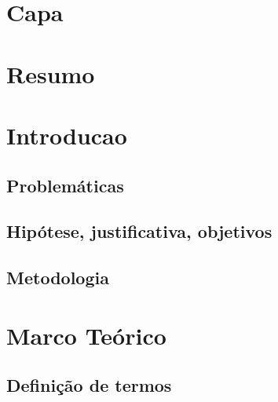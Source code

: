 

% 

\pretextual{} %


% 


% 
% 
% 
% 
% 
% 
% 
% 
% 

\textual{} %

\chapter{Capa}
\chapter{Resumo}
\chapter{Introducao}
\section{Problemáticas}
\cite{BARHAM1978}
\cite{van_bulck_international_2023}
\cite{thomas_visualization_2009}
\cite{miranda_udpskeduler_2012}
\section{Hipótese, justificativa, objetivos}
\section{Metodologia}
\cite{bourque_swebok_2014}
\chapter{Marco Teórico}
\section{Definição de termos}
\cite{Alencar2019} %
\cite{Wren1996}
